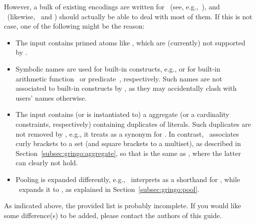 However, a bulk of existing encodings are written for \lparse\
(see, e.g.,~\cite{asparagus}),
and \gringo\ (likewise, \clingo\ and \iclingo) should actually be able to deal with most of them.
If this is not case, one of the following might be the reason:
%
\begin{itemize}
\item
The input contains primed atoms like , which are (currently) not supported by \gringo.
\item
Symbolic names are used for built-in constructs, e.g.,  or 
for built-in arithmetic function~\code{+} or predicate~\code{==}, respectively.
Such names are not associated to built-in constructs by \gringo,
as they may accidentally clash with users' names otherwise.
\item
The input contains (or is instantiated to) 
a  aggregate (or a cardinality constraints, respectively)
containing duplicates of literals.
Such duplicates are not removed by \lparse, e.g.,
it treats 
as a synonym for \code{2[\pred{p}(\const{c})=1,\pred{p}(\const{c})=1]}.
In contrast, \gringo\ associates curly brackets to a set
(and square brackets to a multiset), as described in Section~\ref{subsec:gringo:aggregate}, so that
\code{2\char`\{\pred{p}(\const{c}),\pred{p}(\const{c})\char`\}} is the same as
\code{2\char`\{\pred{p}(\const{c})\char`\}},
where the latter can clearly not hold.
\item
Pooling is expanded differently,
e.g.,
\lparse\ interprets
as a shorthand for
,
while \gringo\ expands it to
,
as explained in Section~\ref{subsec:gringo:pool}.
\end{itemize}
%
As indicated above, the provided list is probably incomplete.
If you would like some difference(s) to be added,
please contact the authors of this guide.


